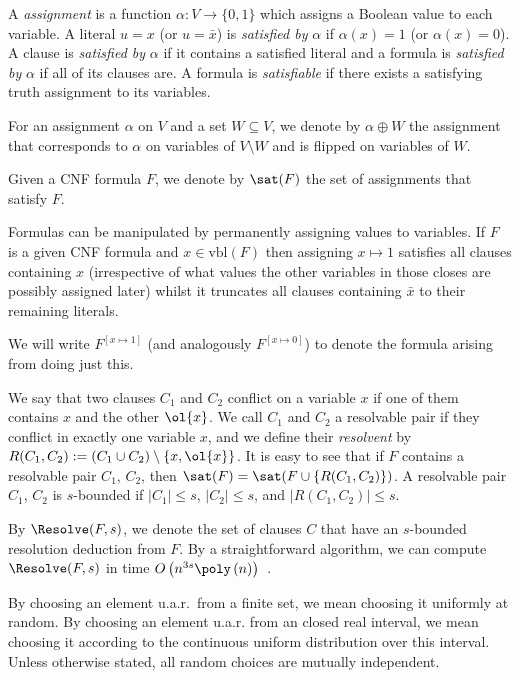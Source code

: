 A \emph{assignment} is a function $\alpha : V \rightarrow
\{0,1\}$ which assigns a Boolean value to each variable. A literal
$u=x$ (or $u=\bar x$) is \emph{satisfied by} $\alpha$ if $\alpha(x)=1$
(or $\alpha(x)=0$). A clause is \emph{satisfied by} $\alpha$ if it
contains a satisfied literal and a formula is \emph{satisfied by}
$\alpha$ if all of its clauses are. A formula is \emph{satisfiable} if
there exists a satisfying truth assignment to its variables.

For an assignment $\alpha$ on $V$ and a set $W\subseteq V$, we denote
by $\alpha\oplus W$ the assignment that corresponds to $\alpha$ on
variables of $V\setminus W$ and is flipped on variables of $W$.

Given a CNF formula $F$, we denote by $\sat(F)$ the set of assignments that
satisfy $F$.

Formulas can be manipulated by permanently assigning values to
variables. If $F$ is a given CNF formula and $x \in \mbox{vbl}(F)$
then assigning $x \mapsto 1$ satisfies all clauses containing $x$
(irrespective of what values the other variables in those closes are
possibly assigned later) whilst it truncates all clauses containing
$\bar x$ to their remaining literals. 

We will write $F^{[x\mapsto1]}$ (and analogously $F^{[x\mapsto 0]}$) to
denote the formula arising from doing just this.

We say that two clauses $C_1$ and $C_2$ conflict on a variable $x$ if
one of them contains $x$ and the other $\ol{x}$. We call $C_1$ and
$C_2$ a resolvable pair if they conflict in exactly one variable $x$,
and we define their \emph{resolvent} by $R(C_1,C_2):=(C_1 \cup C_2)
\setminus \{x,\ol{x}\}$. It is easy to see that if $F$ contains a
resolvable pair $C_1$, $C_2$, then $\sat(F)=\sat(F\cup \{R(C_1,C_2)\})$. A
resolvable pair $C_1$, $C_2$ is $s$-bounded if $|C_1|\leq s$,
$|C_2|\leq s$, and $|R(C_1,C_2)|\leq s$.

By $\Resolve(F,s)$, we denote the set of clauses $C$ that have an
$s$-bounded resolution deduction from $F$. By a straightforward
algorithm, we can compute $\Resolve(F,s)$ in time
$O\left(n^{3s}\poly\left(n\right)\right)$~\cite{ppsz}.

By choosing an element u.a.r.\ from a finite set, we mean choosing it
uniformly at random. By choosing an element u.a.r. from an closed real
interval, we mean choosing it according to the continuous uniform
distribution over this interval. Unless otherwise stated, all random
choices are mutually independent.

